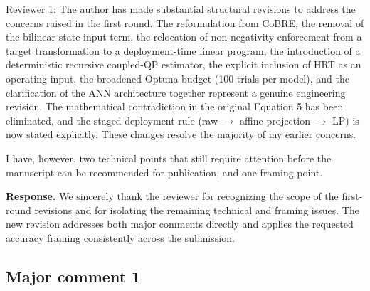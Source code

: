 \documentclass[11pt,a4paper]{article}
\begin{document}
\begin{reviewercomment}
Reviewer 1: The author has made substantial structural revisions to address the concerns raised in the first round. The reformulation from CoBRE, the removal of the bilinear state-input term, the relocation of non-negativity enforcement from a target transformation to a deployment-time linear program, the introduction of a deterministic recursive coupled-QP estimator, the explicit inclusion of HRT as an operating input, the broadened Optuna budget (100 trials per model), and the clarification of the ANN architecture together represent a genuine engineering revision. The mathematical contradiction in the original Equation 5 has been eliminated, and the staged deployment rule (raw $\rightarrow$ affine projection $\rightarrow$ LP) is now stated explicitly. These changes resolve the majority of my earlier concerns.

I have, however, two technical points that still require attention before the manuscript can be recommended for publication, and one framing point.
\end{reviewercomment}

\noindent\textbf{Response.} We sincerely thank the reviewer for recognizing the scope of the first-round revisions and for isolating the remaining technical and framing issues. The new revision addresses both major comments directly and applies the requested accuracy framing consistently across the submission.

\subsection*{Major comment 1}
\end{document}
